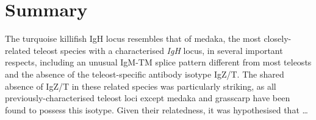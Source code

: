 
\section*{Summary} %


The turquoise killifish IgH locus resembles that of medaka, the most closely-related teleost species with a characterised \textit{IgH} locus, in several important respects, including an unusual IgM-TM splice pattern different from most teleosts and the absence of the teleost-specific antibody isotype IgZ/T. The shared absence of IgZ/T in these related species was particularly striking, as all previously-characterised teleost loci except medaka and grasscarp have been found to possess this isotype. Given their relatedness, it was hypothesised that \dots